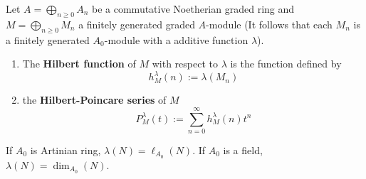 \begin{definition}%
    Let $A=\bigoplus_{n\geq 0} A_n$ be a commutative Noetherian graded ring and $M=\bigoplus_{n\geq 0} M_n$ a finitely generated graded $A$-module (It follows that each $M_n$ is a finitely generated $A_0$-module with a additive function $\lambda$).
    \begin{enumerate}
        \item
              The \textbf{Hilbert function} of $M$ with respect to $\lambda$ is the function defined by
              \begin{equation*}
                  h_M^\lambda(n)
                  :=
                  \lambda\left(M_n\right)
              \end{equation*}
        \item
              the \textbf{Hilbert-Poincare series} of $M$
              \begin{equation*}
                  P_M^\lambda(t)
                  :=
                  \sum_{n=0}^{\infty} h_M^\lambda(n) t^n
              \end{equation*}
    \end{enumerate}
    \begin{remark}
        If $A_0$ is Artinian ring, $\lambda(N)=\ell_{A_0}(N)$. If $A_0$ is a field, $\lambda(N)=\dim_{A_0}(N)$.
    \end{remark}
\end{definition}



